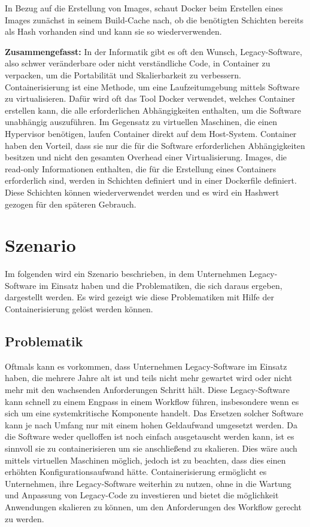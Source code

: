 In Bezug auf die Erstellung von Images, schaut Docker beim Erstellen eines Images zunächst in seinem Build-Cache nach, ob die benötigten Schichten bereits als Hash vorhanden sind und kann sie so wiederverwenden.


\textbf{Zusammengefasst:}
In der Informatik gibt es oft den Wunsch, Legacy-Software, also schwer veränderbare oder nicht verständliche Code, in Container zu verpacken, um die Portabilität und Skalierbarkeit zu verbessern.
Containerisierung ist eine Methode, um eine Laufzeitumgebung mittels Software zu virtualisieren. Dafür wird oft das Tool Docker verwendet, welches Container erstellen kann, die alle erforderlichen Abhängigkeiten enthalten, um die Software unabhängig auszuführen.
Im Gegensatz zu virtuellen Maschinen, die einen Hypervisor benötigen, laufen Container direkt auf dem Host-System. Container haben den Vorteil, dass sie nur die für die Software erforderlichen Abhängigkeiten besitzen und nicht den gesamten Overhead einer Virtualisierung. Images, die read-only Informationen enthalten, die für die Erstellung eines Containers erforderlich sind, werden in Schichten definiert und in einer Dockerfile definiert.
Diese Schichten können wiederverwendet werden und es wird ein Hashwert gezogen für den späteren Gebrauch.


\section{Szenario}
Im folgenden wird ein Szenario beschrieben, in dem Unternehmen Legacy-Software im Einsatz haben und die Problematiken, die sich daraus ergeben, dargestellt werden. Es wird gezeigt wie diese Problematiken mit Hilfe der Containerisierung gelöst werden können.

\subsection{Problematik}
Oftmals kann es vorkommen, dass Unternehmen Legacy-Software im Einsatz haben, die mehrere Jahre alt ist und teils nicht mehr gewartet wird oder nicht mehr mit den wachsenden Anforderungen Schritt hält. Diese Legacy-Software kann schnell zu einem Engpass in einem Workflow führen, insbesondere wenn es sich um eine systemkritische Komponente handelt. Das Ersetzen solcher Software kann je nach Umfang nur mit einem hohen Geldaufwand umgesetzt werden. Da die Software weder quelloffen ist noch einfach ausgetauscht werden kann, ist es sinnvoll sie zu containerisieren um sie anschließend zu skalieren. Dies wäre auch mittels virtuellen Maschinen möglich, jedoch ist zu beachten, dass dies einen erhöhten Konfigurationsaufwand hätte. Containerisierung ermöglicht es Unternehmen, ihre Legacy-Software weiterhin zu nutzen, ohne in die Wartung und Anpassung von Legacy-Code zu investieren und bietet die möglichkeit Anwendungen skalieren zu können, um den Anforderungen des Workflow gerecht zu werden.

